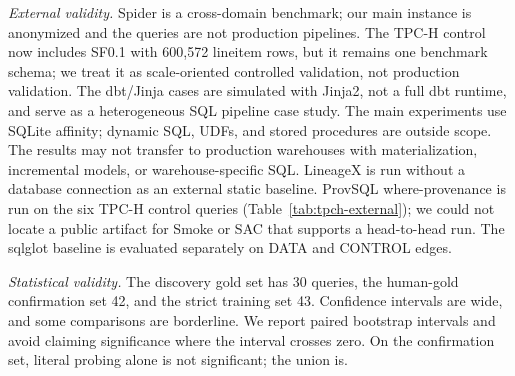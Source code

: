 \documentclass[sigconf, nonacm]{acmart}
\begin{document}
\emph{External validity.} Spider is a cross-domain benchmark; our main instance
is anonymized and the queries are not production pipelines. The TPC-H control
now includes SF0.1 with 600,572 lineitem rows, but it remains one benchmark
schema; we treat it as scale-oriented controlled validation, not production
validation. The dbt/Jinja cases are simulated with Jinja2, not a full dbt runtime,
and serve as a heterogeneous SQL pipeline case study. The main experiments use
SQLite affinity; dynamic SQL, UDFs, and stored procedures are outside scope.
The results may not transfer to production warehouses with materialization,
incremental models, or warehouse-specific SQL. LineageX is run without a
database connection as an external static baseline. ProvSQL where-provenance is
run on the six TPC-H control queries (Table~\ref{tab:tpch-external}); we could
not locate a public artifact for Smoke or SAC that supports a head-to-head run.
The sqlglot baseline is evaluated separately on DATA and CONTROL edges.

\emph{Statistical validity.} The discovery gold set has 30 queries, the
human-gold confirmation set 42, and the strict training set 43. Confidence
intervals are wide, and some comparisons are borderline. We report paired
bootstrap intervals and avoid claiming significance where the interval crosses
zero. On the confirmation set, literal probing alone is not significant; the
union is.
\end{document}
